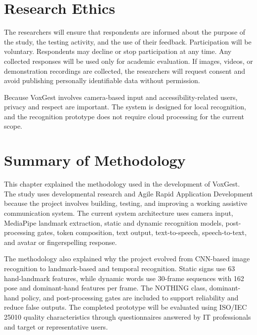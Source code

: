 \section{Research Ethics}

The researchers will ensure that respondents are informed about the purpose of the study, the testing activity, and the use of their feedback. Participation will be voluntary. Respondents may decline or stop participation at any time. Any collected responses will be used only for academic evaluation. If images, videos, or demonstration recordings are collected, the researchers will request consent and avoid publishing personally identifiable data without permission.

Because VoxGest involves camera-based input and accessibility-related users, privacy and respect are important. The system is designed for local recognition, and the recognition prototype does not require cloud processing for the current scope.

\section{Summary of Methodology}

This chapter explained the methodology used in the development of VoxGest. The study uses developmental research and Agile Rapid Application Development because the project involves building, testing, and improving a working assistive communication system. The current system architecture uses camera input, MediaPipe landmark extraction, static and dynamic recognition models, post-processing gates, token composition, text output, text-to-speech, speech-to-text, and avatar or fingerspelling response.

The methodology also explained why the project evolved from CNN-based image recognition to landmark-based and temporal recognition. Static signs use 63 hand-landmark features, while dynamic words use 30-frame sequences with 162 pose and dominant-hand features per frame. The NOTHING class, dominant-hand policy, and post-processing gates are included to support reliability and reduce false outputs. The completed prototype will be evaluated using ISO/IEC 25010 quality characteristics through questionnaires answered by IT professionals and target or representative users.
